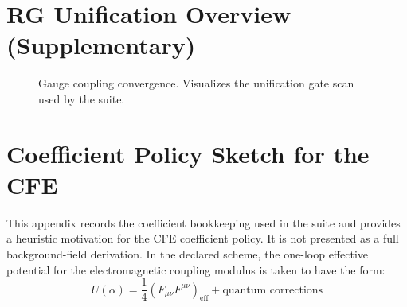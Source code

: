 \section{RG Unification Overview (Supplementary)}

\begin{figure}[H]
\centering
{}
\caption{Gauge coupling convergence. Visualizes the unification gate scan used by the suite.}
\label{fig:rg-unification}
\end{figure}

\section{Coefficient Policy Sketch for the CFE}

This appendix records the coefficient bookkeeping used in the suite and provides a
heuristic motivation for the CFE coefficient policy. It is not presented as a full
background-field derivation. In the declared scheme, the one-loop effective potential
for the electromagnetic coupling modulus is taken to have the form:
\begin{equation}
    U(\alpha) = \frac{1}{4}(F_{\mu\nu}F^{\mu\nu})_{\text{eff}} 
        + \text{quantum corrections}
\end{equation}

